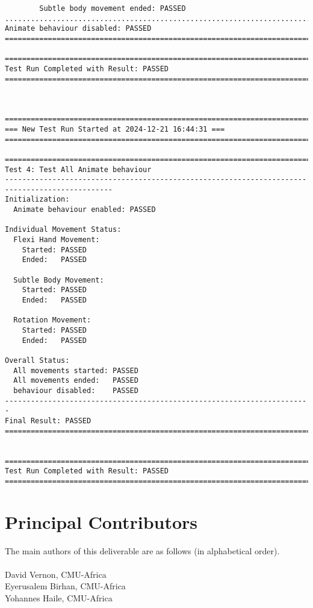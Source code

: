 \documentclass{CSSRforAfrica}
\newcommand{\blank}{~\\}
\begin{document}
\begin{verbatim}
        Subtle body movement ended: PASSED
.......................................................................
Animate behaviour disabled: PASSED
=======================================================================

=======================================================================
Test Run Completed with Result: PASSED
=======================================================================



=======================================================================
=== New Test Run Started at 2024-12-21 16:44:31 ===
=======================================================================

=======================================================================
Test 4: Test All Animate behaviour
-----------------------------------------------------------------------------------------------
Initialization:
  Animate behaviour enabled: PASSED

Individual Movement Status:
  Flexi Hand Movement:
    Started: PASSED
    Ended:   PASSED

  Subtle Body Movement:
    Started: PASSED
    Ended:   PASSED

  Rotation Movement:
    Started: PASSED
    Ended:   PASSED

Overall Status:
  All movements started: PASSED
  All movements ended:   PASSED
  behaviour disabled:    PASSED
-----------------------------------------------------------------------
Final Result: PASSED
=======================================================================


=======================================================================
Test Run Completed with Result: PASSED
=======================================================================
\end{verbatim}


\newpage

\nocite{*}  


\newpage

\section*{Principal Contributors}
\label{contributors}
The main authors of this deliverable are as follows (in alphabetical order).
\blank
~
\blank
David Vernon, CMU-Africa\\
Eyerusalem Birhan, CMU-Africa\\ 
Yohannes Haile, CMU-Africa\\ 
\end{document}
